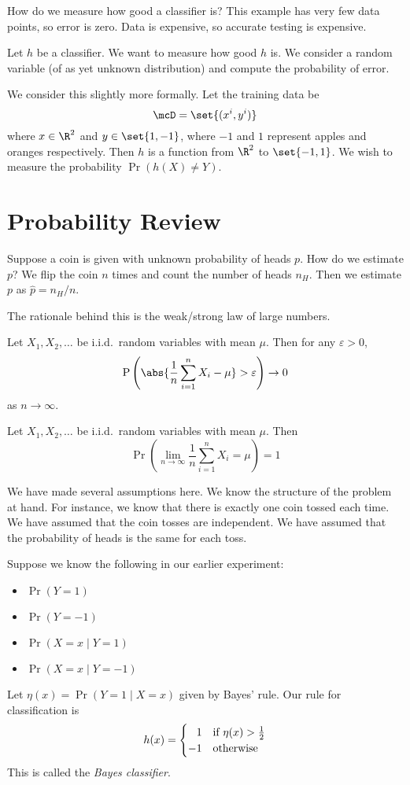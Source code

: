 How do we measure how good a classifier is?
This example has very few data points, so error is zero.
Data is expensive, so accurate testing is expensive.

Let $h$ be a classifier.
We want to measure how good $h$ is.
We consider a random variable (of as yet unknown distribution) and compute
the probability of error.

We consider this slightly more formally.
Let the training data be \[
    \mcD = \set{(x^i, y^i)}
\] where $x \in \R^2$ and $y \in \set{1, -1}$, where $-1$ and $1$ represent
apples and oranges respectively.
Then $h$ is a function from $\R^2$ to $\set{-1, 1}$.
We wish to measure the probability $\Pr(h(X) \ne Y)$.

\section{Probability Review} \label{sec:probability_review}
Suppose a coin is given with unknown probability of heads $p$.
How do we estimate $p$?
We flip the coin $n$ times and count the number of heads $n_H$.
Then we estimate $p$ as $\hat{p} = n_H/n$.

The rationale behind this is the weak/strong law of large numbers.
\begin{fact} \label{thm:probability_review:wlln}
    Let $X_1, X_2, \ldots$ be i.i.d.~random variables with mean $\mu$.
    Then for any $\varepsilon > 0$, \[
        \Pr\left(\abs{\frac{1}{n} \sum_{i=1}^n X_i - \mu} > \varepsilon\right)
        \to 0
    \] as $n \to \infty$.
\end{fact}

\begin{fact} \label{thm:probability_review:slln}
    Let $X_1, X_2, \ldots$ be i.i.d.~random variables with mean $\mu$.
    Then \[
        \Pr\left(\lim_{n \to \infty} \frac{1}{n} \sum_{i=1}^n X_i = \mu\right)
        = 1
    \]
\end{fact}
We have made several assumptions here.
We know the structure of the problem at hand.
For instance, we know that there is exactly one coin tossed each time.
We have assumed that the coin tosses are independent.
We have assumed that the probability of heads is the same for each toss.

Suppose we know the following in our earlier experiment:
\begin{itemize}
    \item $\Pr(Y = 1)$
    \item $\Pr(Y = -1)$
    \item $\Pr(X = x \mid Y = 1)$
    \item $\Pr(X = x \mid Y = -1)$
\end{itemize}
Let $\eta(x) = \Pr(Y = 1 \mid X = x)$ given by Bayes' rule.
Our rule for classification is \[
    h(x) = \begin{cases}
        \hphantom{-}1 & \text{if } \eta(x) > \frac{1}{2} \\
        -1 & \text{otherwise}
    \end{cases}
\] This is called the \emph{Bayes classifier}.


